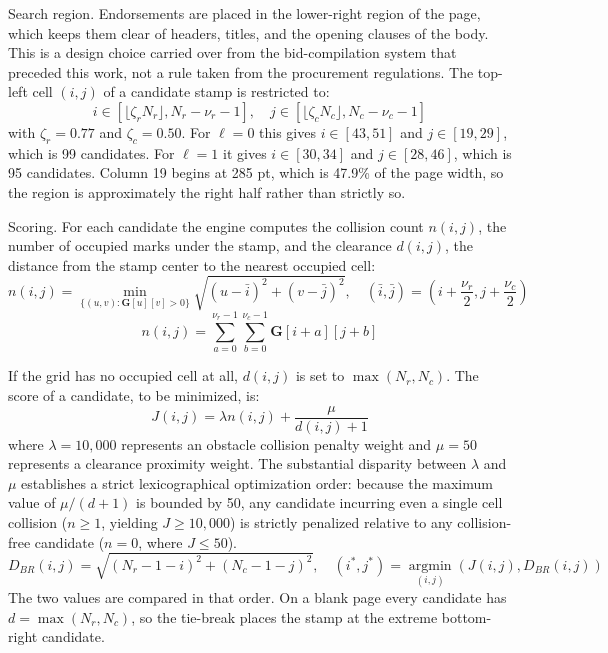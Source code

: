 Search region. Endorsements are placed in the lower-right region of the page, which keeps them clear of headers, titles, and the opening clauses of the body.
This is a design choice carried over from the bid-compilation system that preceded this work, not a rule taken from the procurement regulations.
The top-left cell $(i, j)$ of a candidate stamp is restricted to:
\begin{equation}
\label{eq:search_region_bounds}
i \in [\lfloor \zeta_r N_r \rfloor, N_r - \nu_r - 1], \quad j \in [\lfloor \zeta_c N_c \rfloor, N_c - \nu_c - 1]
\end{equation}
with $\zeta_r = 0.77$ and $\zeta_c = 0.50$.
For $\ell = 0$ this gives $i \in [43, 51]$ and $j \in [19, 29]$, which is 99 candidates. For $\ell = 1$ it gives $i \in [30, 34]$ and $j \in [28, 46]$, which is 95 candidates. Column 19 begins at 285 pt, which is 47.9\% of the page width, so the region is approximately the right half rather than strictly so.

Scoring. For each candidate the engine computes the collision count $n(i, j)$, the number of occupied marks under the stamp, and the clearance $d(i, j)$, the distance from the stamp center to the nearest occupied cell:
\begin{equation}
\label{eq:clearance_distance}
n(i, j) = \min_{\{(u, v) : \mathbf{G}[u][v] > 0\}} \sqrt{(u - \bar{i})^2 + (v - \bar{j})^2}, \quad (\bar{i}, \bar{j}) = \left( i + \frac{\nu_r}{2}, j + \frac{\nu_c}{2} \right)
\end{equation}
\begin{equation}
\label{eq:collision_count}
n(i, j) = \sum_{a=0}^{\nu_r - 1} \sum_{b=0}^{\nu_c - 1} \mathbf{G}[i + a][j + b]
\end{equation}

If the grid has no occupied cell at all, $d(i, j)$ is set to $\max(N_r, N_c)$.
The score of a candidate, to be minimized, is:
\begin{equation}
\label{eq:objective_cost_function}
J(i, j) = \lambda n(i, j) + \frac{\mu}{d(i, j) + 1}
\end{equation}
where $\lambda=10{,}000$ represents an obstacle collision penalty weight and $\mu=50$ represents a clearance proximity weight. The substantial disparity between $\lambda$ and $\mu$ establishes a strict lexicographical optimization order: because the maximum value of $\mu/(d+1)$ is bounded by 50, any candidate incurring even a single cell collision ($n\geq1$, yielding $J\geq10{,}000$) is strictly penalized relative to any collision-free candidate ($n=0$, where $J\leq50$).
\begin{equation}
\label{eq:tie_breaking_argmin}
D_{BR}(i, j) = \sqrt{(N_r - 1 - i)^2 + (N_c - 1 - j)^2}, \quad (i^*, j^*) = \operatorname*{argmin}_{(i, j)} (J(i, j), D_{BR}(i, j))
\end{equation}
The two values are compared in that order.
On a blank page every candidate has $d = \max(N_r, N_c)$, so the tie-break places the stamp at the extreme bottom-right candidate.


